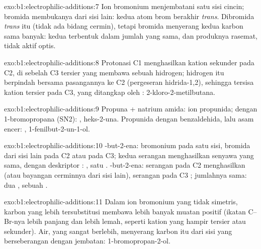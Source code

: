 \begin{solution}{exo:b1:electrophilic-additions:7}
Ion bromonium menjembatani satu sisi cincin; bromida membukanya dari sisi
lain: kedua atom brom berakhir \textit{trans}. Dibromida \textit{trans}
itu  (tidak ada bidang cermin), tetapi bromida menyerang kedua karbon
sama banyak: kedua  terbentuk dalam jumlah yang sama, dan
produknya rasemat, tidak aktif optis.
\end{solution}

\begin{solution}{exo:b1:electrophilic-additions:8}
Protonasi C1 menghasilkan kation sekunder pada C2, di sebelah C3 tersier
yang membawa sebuah hidrogen; hidrogen itu berpindah bersama pasangannya
ke C2 (pergeseran hidrida-1,2), sehingga tersisa kation tersier pada C3,
yang ditangkap oleh : 2-kloro-2-metilbutana.
\end{solution}

\begin{solution}{exo:b1:electrophilic-additions:9}
Propuna + natrium amida: ion propunida; dengan 1-bromopropana (SN2):
, heks-2-una. Propunida dengan benzaldehida, lalu
asam encer: , 1-fenilbut-2-un-1-ol.
\end{solution}

\begin{solution}{exo:b1:electrophilic-additions:10}
-but-2-ena: bromonium pada satu sisi, bromida dari sisi lain pada
C2 atau pada C3; kedua serangan menghasilkan senyawa yang sama, dengan
deskriptor : , satu . -but-2-ena:
serangan pada C2 menghasilkan  (atau bayangan cerminnya dari
sisi lain), serangan pada C3 ; jumlahnya sama: dua
, sebuah .
\end{solution}

\begin{solution}{exo:b1:electrophilic-additions:11}
Dalam ion bromonium yang tidak simetris, karbon yang lebih tersubstitusi
membawa lebih banyak muatan positif (ikatan C--Br-nya lebih panjang dan
lebih lemah, seperti kation yang hampir tersier atau sekunder). Air, yang
sangat berlebih, menyerang karbon itu dari sisi yang berseberangan dengan
jembatan: 1-bromopropan-2-ol.
\end{solution}

